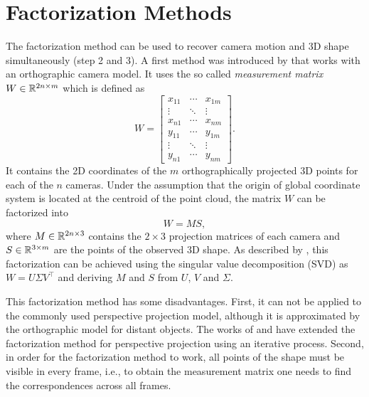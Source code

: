 	\section{Factorization Methods}
		The factorization method can be used to recover camera motion and 3D shape simultaneously (step 2 and 3).
		A first method was introduced by \cite{tomasi1992factorization} that works with an orthographic camera model.
		It uses the so called \emph{measurement matrix} $W \in \mathbb{R}^{2n \times m}$ which is defined as
		\begin{equation}\label{eq:measurement_matrix}
			W =
			\begin{bmatrix}
				x_{11} & \cdots & x_{1m} \\ 
				\vdots & \ddots & \vdots \\ 
				x_{n1} & \cdots & x_{nm} \\ 
				y_{11} & \cdots & y_{1m} \\ 
				\vdots & \ddots & \vdots \\ 
				y_{n1} & \cdots & y_{nm}
			\end{bmatrix}. 
		\end{equation}
		It contains the 2D coordinates of the $m$ orthographically projected 3D points for each of the $n$ cameras.
		Under the assumption that the origin of global coordinate system is located at the centroid of the point cloud, the matrix $W$ can be factorized into
		\begin{equation}\label{eq:factorization_method}
			W = MS,
		\end{equation}
		where $M \in \mathbb{R}^{2n \times 3}$ contains the $2 \times 3$ projection matrices of each camera and $S \in \mathbb{R}^{3 \times m}$  are the points of the observed 3D shape.
		As described by \cite{tomasi1992factorization}, this factorization can be achieved using the singular value decomposition (SVD) as $W = U \varSigma V^\top$ and deriving $M$ and $S$ from $U$, $V$ and $\varSigma$.
		
		This factorization method has some disadvantages.
		First, it can not be applied to the commonly used perspective projection model, although it is approximated by the orthographic model for distant objects.
		The works of \cite{sturm1996factorization} and \cite{christy1996euclidean} have extended the factorization method for perspective projection using an iterative process.
		Second, in order for the factorization method to work, all points of the shape must be visible in every frame, i.e., to obtain the measurement matrix one needs to find the correspondences across all frames.
		
